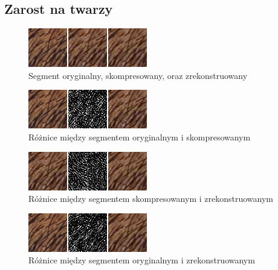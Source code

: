 \documentclass[a4paper, 12pt]{article}
\begin{document}
\newpage
\subsection{Zarost na twarzy}
\begin{figure}[h!]
\begin{center}
	\includegraphics[width=0.85\columnwidth]{compare_sample2.png}
	\caption{Segment oryginalny, skompresowany, oraz zrekonstruowany}
\end{center}
\end{figure}
\begin{figure}[h!]
\begin{center}
	\includegraphics[width=0.85\columnwidth]{orig_vs_comp2.png}
	\caption{Różnice między segmentem oryginalnym i skompresowanym}
\end{center}
\end{figure}
\begin{figure}[h!]
\begin{center}
	\includegraphics[width=0.85\columnwidth]{comp_vs_rest2.png}
	\caption{Różnice między segmentem skompresowanym i zrekonstruowanym}
\end{center}
\end{figure}
\begin{figure}[h!]
\begin{center}
	\includegraphics[width=0.85\columnwidth]{orig_vs_rest2.png}
	\caption{Różnice między segmentem oryginalnym i zrekonstruowanym}
\end{center}
\end{figure}
\end{document}
